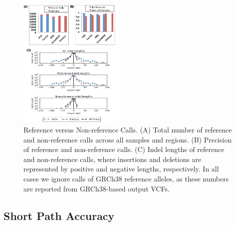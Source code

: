 \begin{figure}
\centering
\includegraphics[width=2in]{figures/04_bakeoff/figure05.png}
\caption[Reference versus non-reference calls]{Reference versus Non-reference Calls. (A) Total number of
reference and non-reference calls across all samples and regions. (B)
Precision of reference and non-reference calls. (C) Indel lengths of
reference and non-reference calls, where insertions and deletions are
represented by positive and negative lengths, respectively. In all cases
we ignore calls of GRCh38 reference alleles, as these numbers are
reported from GRCh38-based output VCFs.}
\label{fig:bakeoff:refnonref}
\end{figure}

\subsection{Short Path Accuracy}

